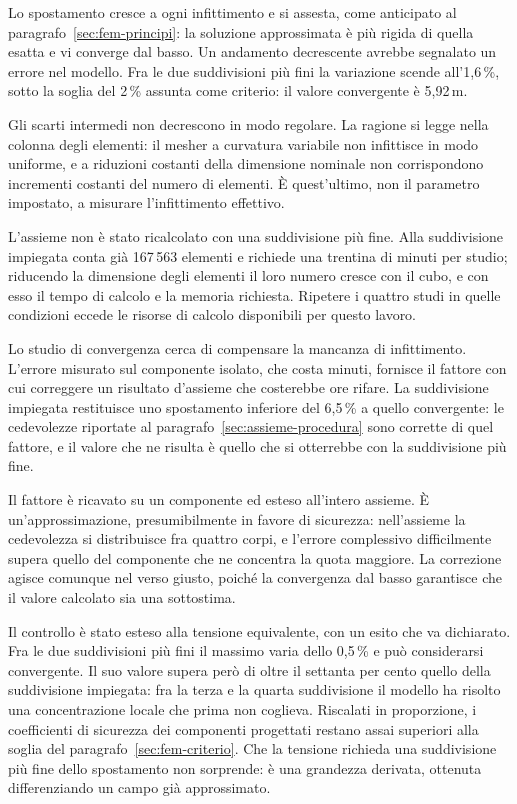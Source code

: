 Lo spostamento cresce a ogni infittimento e si assesta, come anticipato al
paragrafo~\ref{sec:fem-principi}: la soluzione approssimata è più rigida di
quella esatta e vi converge dal basso. Un andamento decrescente avrebbe
segnalato un errore nel modello. Fra le due suddivisioni più fini la variazione
scende all'1,6\,\%, sotto la soglia del 2\,\% assunta come criterio: il valore
convergente è 5,92\,\textmu m.

Gli scarti intermedi non decrescono in modo regolare. La ragione si legge nella
colonna degli elementi: il mesher a curvatura variabile non infittisce in modo
uniforme, e a riduzioni costanti della dimensione nominale non corrispondono
incrementi costanti del numero di elementi. È quest'ultimo, non il parametro
impostato, a misurare l'infittimento effettivo.

L'assieme non è stato ricalcolato con una suddivisione più fine. Alla
suddivisione impiegata conta già 167\,563 elementi e richiede una trentina di
minuti per studio; riducendo la dimensione degli elementi il loro numero cresce
con il cubo, e con esso il tempo di calcolo e la memoria richiesta. Ripetere i
quattro studi in quelle condizioni eccede le risorse di calcolo disponibili per
questo lavoro.

Lo studio di convergenza cerca di compensare la mancanza di infittimento. L'errore misurato sul
componente isolato, che costa minuti, fornisce il fattore con cui correggere un
risultato d'assieme che costerebbe ore rifare. La suddivisione impiegata
restituisce uno spostamento inferiore del 6,5\,\% a quello convergente: le
cedevolezze riportate al paragrafo~\ref{sec:assieme-procedura} sono corrette di
quel fattore, e il valore che ne risulta è quello che si otterrebbe con la
suddivisione più fine.

Il fattore è ricavato su un componente ed esteso all'intero assieme. È
un'approssimazione, presumibilmente in favore di sicurezza: nell'assieme la
cedevolezza si distribuisce fra quattro corpi, e l'errore complessivo
difficilmente supera quello del componente che ne concentra la quota maggiore.
La correzione agisce comunque nel verso giusto, poiché la convergenza dal basso
garantisce che il valore calcolato sia una sottostima.

Il controllo è stato esteso alla tensione equivalente, con un esito che va
dichiarato. Fra le due suddivisioni più fini il massimo varia dello 0,5\,\% e può
considerarsi convergente. Il suo valore supera però di oltre il settanta per
cento quello della suddivisione impiegata: fra la terza e la quarta suddivisione
il modello ha risolto una concentrazione locale che prima non coglieva.
Riscalati in proporzione, i coefficienti di sicurezza dei componenti progettati
restano assai superiori alla soglia del paragrafo~\ref{sec:fem-criterio}. Che la
tensione richieda una suddivisione più fine dello spostamento non sorprende: è
una grandezza derivata, ottenuta differenziando un campo già approssimato.

